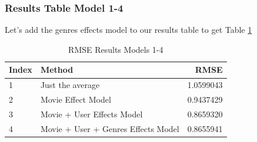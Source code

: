 \documentclass[
]{article}
\newenvironment{Shaded}{}{}
\newcommand{\AttributeTok}[1]{\textcolor[rgb]{0.49,0.56,0.16}{#1}}
\newcommand{\DecValTok}[1]{\textcolor[rgb]{0.25,0.63,0.44}{#1}}
\newcommand{\FloatTok}[1]{\textcolor[rgb]{0.25,0.63,0.44}{#1}}
\newcommand{\FunctionTok}[1]{\textcolor[rgb]{0.02,0.16,0.49}{#1}}
\newcommand{\NormalTok}[1]{#1}
\newcommand{\OtherTok}[1]{\textcolor[rgb]{0.00,0.44,0.13}{#1}}
\newcommand{\SpecialCharTok}[1]{\textcolor[rgb]{0.25,0.44,0.63}{#1}}
\newcommand{\StringTok}[1]{\textcolor[rgb]{0.25,0.44,0.63}{#1}}
\begin{document}
\begin{Shaded}
\end{Shaded}

\newpage

\hypertarget{results-table-model-1-4}{%
\subsubsection{Results Table Model 1-4}\label{results-table-model-1-4}}

Let's add the genres effects model to our results table to get Table
\ref{tbl:rmse_results_model_1-4}

\begin{table}[H]

\caption{\label{tab:ge_7}RMSE Results Models 1-4\label{tbl:rmse_results_model_1-4}}
\centering
\fontsize{7}{9}\selectfont
\begin{tabular}[t]{llr}
\toprule
Index & Method & RMSE\\
\midrule
1 & Just the average & 1.0599043\\
2 & Movie Effect Model & 0.9437429\\
3 & Movie + User Effects Model & 0.8659320\\
4 & Movie + User + Genres Effects Model & 0.8655941\\
\bottomrule
\end{tabular}
\end{table}
\end{document}
